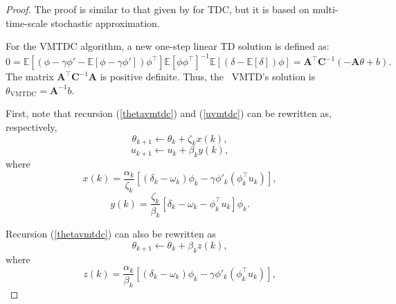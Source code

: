 \begin{proof}
The proof is similar to that given by \cite{sutton2009fast} for TDC, but it is based on multi-time-scale stochastic approximation.

For the VMTDC algorithm, a new one-step linear TD solution is defined as:
\begin{equation*}
    0=\mathbb{E}[({\phi} - \gamma {\phi}' - \mathbb{E}[{\phi} - \gamma {\phi}']){\phi}^\top]\mathbb{E}[{\phi} {\phi}^{\top}]^{-1}\mathbb{E}[(\delta -\mathbb{E}[\delta]){\phi}]=\textbf{A}^{\top}\textbf{C}^{-1}(-\textbf{A}{\theta}+{b}).
\end{equation*}
The matrix $\textbf{A}^{\top}\textbf{C}^{-1}\textbf{A}$ is positive definite. Thus, the  VMTD's solution is
${\theta}_{\text{VMTDC}}=\textbf{A}^{-1}{b}$.

First, note that recursion (\ref{thetavmtdc}) and (\ref{uvmtdc}) can be rewritten as, respectively, 
\begin{equation*}
 {\theta}_{k+1}\leftarrow {\theta}_k+\zeta_k {x}(k),
\end{equation*}
\begin{equation*}
 {u}_{k+1}\leftarrow {u}_k+\beta_k {y}(k),
\end{equation*}
where 
\begin{equation*}
 {x}(k)=\frac{\alpha_k}{\zeta_k}[(\delta_{k}- \omega_k) {\phi}_k - \gamma{\phi}'_{k}({\phi}^{\top}_k {u}_k)],
\end{equation*}
\begin{equation*}
 {y}(k)=\frac{\zeta_k}{\beta_k}[\delta_{k}-\omega_k - {\phi}^{\top}_k {u}_k]{\phi}_k.
\end{equation*}

Recursion (\ref{thetavmtdc}) can also be rewritten as
\begin{equation*}
 {\theta}_{k+1}\leftarrow {\theta}_k+\beta_k z(k),
\end{equation*}
where
\begin{equation*}
 z(k)=\frac{\alpha_k}{\beta_k}[(\delta_{k}- \omega_k) {\phi}_k - \gamma{\phi}'_{k}({\phi}^{\top}_k {u}_k)],
\end{equation*}


\end{proof}
